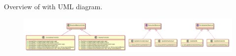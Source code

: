 Overview of \texttt{\pkg} with UML diagram.

\begin{figure}[H]
	\centering
	\includegraphics[width=\textwidth]{packageDiagrams/updatePackage}
\end{figure}
